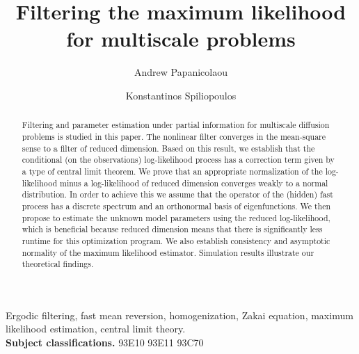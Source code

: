 \documentclass{article}
\begin{document}
\baselineskip 0.58cm

%

\title{Filtering the maximum likelihood for multiscale problems}
\author{Andrew Papanicolaou\footnotemark[2]\and Konstantinos Spiliopoulos\footnotemark[3]}



\maketitle

\begin{abstract}
Filtering and parameter estimation under partial information for multiscale diffusion problems is studied in this paper. The nonlinear filter converges in the mean-square
sense to a filter of reduced dimension. Based on this result, we  establish that the conditional (on the observations) log-likelihood process has a correction term given
by a type of central limit theorem. We prove that an appropriate normalization of the log-likelihood minus a log-likelihood of reduced dimension converges weakly to a
normal distribution. In order to achieve this we assume that the operator of the (hidden) fast process has a discrete spectrum and an orthonormal basis of eigenfunctions. We then propose to estimate the unknown model parameters using the reduced log-likelihood, which is beneficial because reduced dimension means that there is significantly less runtime for this optimization program. We also establish consistency and asymptotic normality of the maximum likelihood estimator. Simulation results illustrate our theoretical findings.
\end{abstract}
\begin{keywords}Ergodic filtering, fast mean reversion, homogenization, Zakai equation, maximum likelihood estimation, central limit theory.\\
{\bf Subject classifications. } 93E10 93E11 93C70
\end{keywords}

\end{document}
